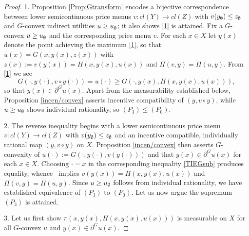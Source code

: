 \begin{proof}
	1. Proposition \ref{Prop:Gtransform} encodes a bijective correspondence between
lower semicontinuous price menus $v:cl(Y) \longrightarrow cl(Z)$ with $v(y_{\emptyset}) \le z_{\emptyset}$
and $G$-convex indirect utilities $u \ge u_{\emptyset}$; it also shows \eqref{1} is attained.
Fix a $G$-convex $u \ge u_{\emptyset}$ and the corresponding price menu
$v$.  For each $x \in X$ let $y(x)$ denote the point achieving the maximum \eqref{1}, so that 
$u(x) = G(x,y(x),z(x))$ with $z(x):=v(y(x)) = H(x,y(x),u(x))$ and $\Pi(v,y) = \tilde \Pi(u, y)$.
From \eqref{1} we see
\begin{equation}\label{TIEGsub}
	G(\cdot, y(\cdot),v\circ y(\cdot)) = u(\cdot) \ge G(\cdot, y(x),H(x,y(x),u(x))),
\end{equation}
so that $y(x) \in \partial^Gu(x)$.  Apart from the measurability established below,
Proposition \ref{incen/convex} asserts incentive compatibility of $(y,v \circ y)$,
while $u \ge u_{\emptyset}$ shows individual rationality, so $(P_3)\le(P_0)$.  \medskip
											
	2. The reverse inequality begins with a lower semicontinuous price menu $v:cl(Y) \longrightarrow cl(Z)$ with 
$v(y_{\emptyset}) \le z_{\emptyset}$ and an incentive compatible, individually rational map $(y,v \circ y)$ on $X$. 
Proposition \ref{incen/convex}
then asserts $G$-convexity of $u(\cdot) :=G(\cdot, y(\cdot),v(y(\cdot)))$ and that $y(x) \in \partial^Gu(x)$ for each 
$x \in X$.  Choosing $\cdot = x$ in the corresponding inequality \eqref{TIEGsub}
produces equality, whence \Gfour\ implies
$v(y(x)) = H(x,y(x),u(x))$ and $\Pi(v,y) = \tilde \Pi(u, y)$.  Since $u \ge u_{\emptyset}$ follows from individual 
rationality, we have established equivalence of $(P_3)$ to $(P_0)$.  Let us now argue the supremum $(P_3)$ is attained.\medskip
							
							
	3. Let us first show  $\pi(x, y(x), H(x,y(x), u(x)))$ is measurable on $X$ for all $G$-convex $u$ and $y(x) \in \partial^G u(x)$.
											

\end{proof}
